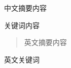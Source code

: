 

\begin{zhaiyao}

中文摘要内容







\end{zhaiyao}




\begin{guanjianci}
关键词内容
\end{guanjianci}



\begin{abstract}
英文摘要内容

\end{abstract}



\begin{keywords}
英文关键词
\end{keywords}